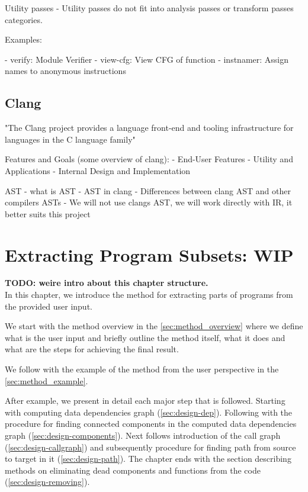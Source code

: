 \documentclass[12pt, twoside]{fithesis2}
\renewcommand{\_}{\leavevmode \kern0.07em\vbox{\hrule width0.4em}}
\begin{document}
Utility passes
- Utility passes do not fit into analysis passes or transform passes categories.

Examples:

- verify: Module Verifier
- view-cfg: View CFG of function
- instnamer: Assign names to anonymous instructions

\section{Clang}
\label{sec:llvm-clang}

"The Clang project provides a language front-end and tooling infrastructure for
languages in the C language family"

Features and Goals (some overview of clang):
- End-User Features
- Utility and Applications
- Internal Design and Implementation

AST
- what is AST
- AST in clang
- Differences between clang AST and other compilers ASTs
- We will not use clangs AST, we will work directly with IR, it better suits
this project


\chapter{Extracting Program Subsets: WIP}
\label{chap:design}

\textbf{TODO: weire intro about this chapter structure.}
\\
In this chapter, we introduce the method for extracting parts of programs
from the provided user input.

We start with the method overview in the \autoref{sec:method_overview} where we
define what is the user input and briefly outline the method itself, what it
does and what are the steps for achieving the final result.

We follow with the example of the method from the user perspective in the
\autoref{sec:method_example}.

After example, we present in detail each major step that is followed.
Starting with computing data dependencies graph
(\autoref{sec:design-dep}).
Following with the procedure for finding connected components in the computed
data dependencies graph (\autoref{sec:design-components}).
Next follows introduction of the call graph (\autoref{sec:design-callgraph}) and
subsequently procedure for finding path from source to target in it
(\autoref{sec:design-path}).
The chapter ends with the section describing methods on eliminating dead
components and functions from the code (\autoref{sec:design-removing}).
\end{document}
